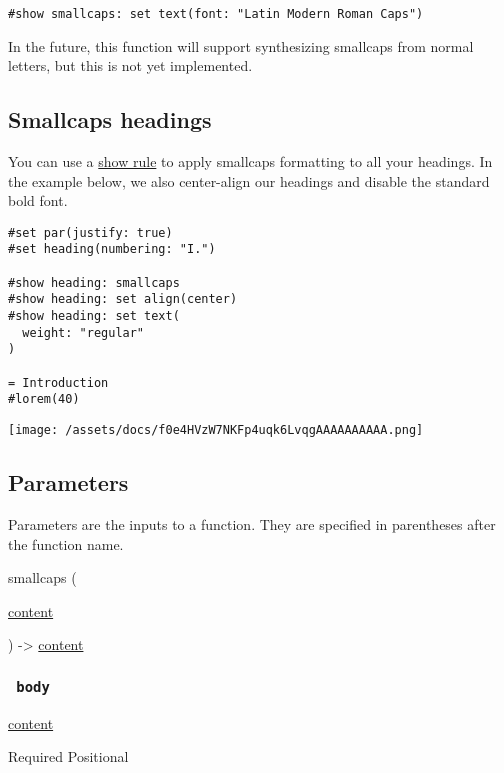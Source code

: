 \begin{verbatim}
#show smallcaps: set text(font: "Latin Modern Roman Caps")
\end{verbatim}

In the future, this function will support synthesizing smallcaps from
normal letters, but this is not yet implemented.

\subsection{Smallcaps headings}\label{smallcaps-headings}

You can use a \href{/docs/reference/styling/\#show-rules}{show rule} to
apply smallcaps formatting to all your headings. In the example below,
we also center-align our headings and disable the standard bold font.

\begin{verbatim}
#set par(justify: true)
#set heading(numbering: "I.")

#show heading: smallcaps
#show heading: set align(center)
#show heading: set text(
  weight: "regular"
)

= Introduction
#lorem(40)
\end{verbatim}

\texttt{[image: /assets/docs/f0e4HVzW7NKFp4uqk6LvqgAAAAAAAAAA.png]}

\subsection{\texorpdfstring{{ Parameters
}}{ Parameters }}\label{parameters}

\label{parameters-tooltip}
Parameters are the inputs to a function. They are specified in
parentheses after the function name.

{ smallcaps } (

{ \href{/docs/reference/foundations/content/}{content} }

) -\textgreater{} \href{/docs/reference/foundations/content/}{content}

\subsubsection{\texorpdfstring{\texttt{\ body\ }}{ body }}\label{parameters-body}

\href{/docs/reference/foundations/content/}{content}

{Required} {{ Positional }}


